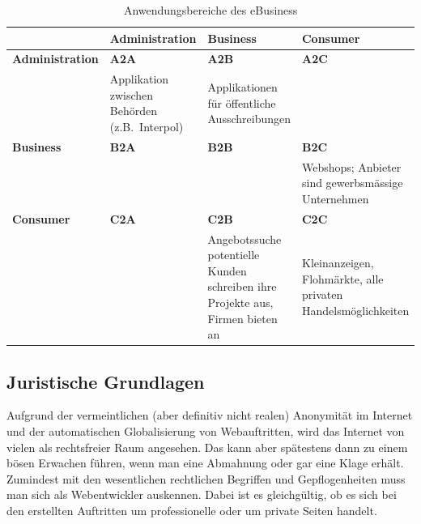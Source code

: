 \begin{table}
    \begin{center}
        \begin{tabular}[ht]{|p{3.5cm}|p{4cm}|p{4cm}|p{4cm}|}
            \hline
            \cellcolor{orange!25} &
            \cellcolor{orange!25}\textbf{Administration} &
            \cellcolor{orange!25}\textbf{Business} &
            \cellcolor{orange!25}\textbf{Consumer} \\ \hline
            \cellcolor{orange!25}\textbf{Administration} & \textbf{A2A} & \textbf{A2B} & \textbf{A2C}      \\
            \cellcolor{orange!25}                  & Applikation zwischen Behörden (z.B.~Interpol)
            & Applikationen für öffentliche Ausschreibungen &      \\ \hline
            \cellcolor{orange!25}\textbf{Business} & \textbf{B2A} & \textbf{B2B} & \textbf{B2C}  \\
            \cellcolor{orange!25}                  & & & Webshops; Anbieter sind gewerbsmässige Unternehmen  \\ \hline
            \cellcolor{orange!25}\textbf{Consumer} & \textbf{C2A} & \textbf{C2B} & \textbf{C2C}  \\
            \cellcolor{orange!25}                  & & Angebotssuche potentielle Kunden schreiben ihre Projekte aus, Firmen bieten an
            & Kleinanzeigen, Flohmärkte, alle privaten Handelsmöglichkeiten \\ \hline
        \end{tabular}
    \end{center}
    \caption{Anwendungsbereiche des eBusiness}
\end{table}


\subsection{Juristische Grundlagen}
\label{subsec:juristische-grundlagen}

Aufgrund der vermeintlichen (aber definitiv nicht realen) Anonymität im
Internet und der automatischen Globalisierung von Webauftritten, wird das
Internet von vielen als rechtsfreier Raum angesehen. Das kann aber
spätestens dann zu einem bösen Erwachen führen, wenn man eine Abmahnung
oder gar eine Klage erhält. Zumindest mit den wesentlichen rechtlichen
Begriffen und Gepflogenheiten muss man sich als Webentwickler auskennen.
Dabei ist es gleichgültig, ob es sich bei den erstellten Auftritten um
professionelle oder um private Seiten handelt.

